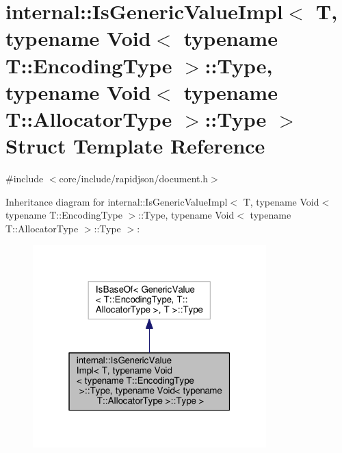 \hypertarget{structinternal_1_1IsGenericValueImpl_3_01T_00_01typename_01Void_3_01typename_01T_1_1EncodingType794abcc01fcce01e300668fa57e4d036}{}\section{internal\+:\+:Is\+Generic\+Value\+Impl$<$ T, typename Void$<$ typename T\+:\+:Encoding\+Type $>$\+:\+:Type, typename Void$<$ typename T\+:\+:Allocator\+Type $>$\+:\+:Type $>$ Struct Template Reference}
\label{structinternal_1_1IsGenericValueImpl_3_01T_00_01typename_01Void_3_01typename_01T_1_1EncodingType794abcc01fcce01e300668fa57e4d036}


{\ttfamily \#include $<$core/include/rapidjson/document.\+h$>$}



Inheritance diagram for internal\+:\+:Is\+Generic\+Value\+Impl$<$ T, typename Void$<$ typename T\+:\+:Encoding\+Type $>$\+:\+:Type, typename Void$<$ typename T\+:\+:Allocator\+Type $>$\+:\+:Type $>$\+:
\nopagebreak
\begin{figure}[H]
\begin{center}
\leavevmode
\includegraphics[width=256pt]{structinternal_1_1IsGenericValueImpl_3_01T_00_01typename_01Void_3_01typename_01T_1_1EncodingType58540891eb64185bb80db4fd8d861649}
\end{center}
\end{figure}


